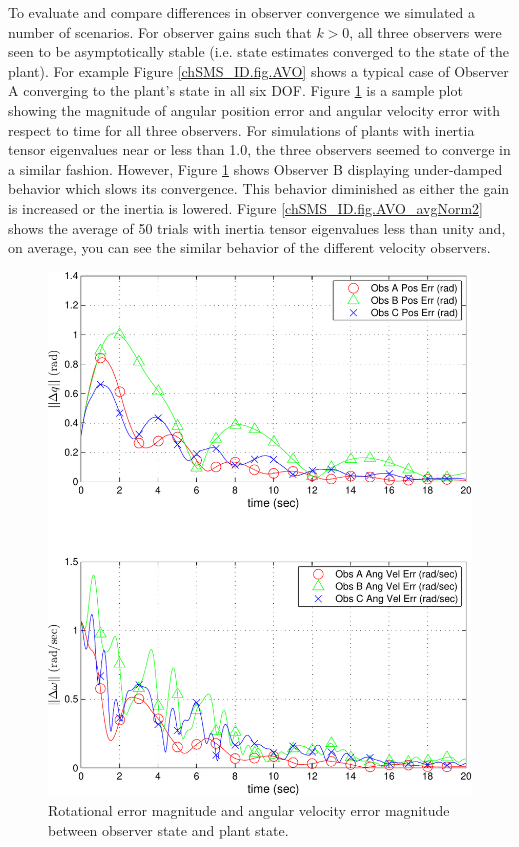 To evaluate and compare differences in observer convergence we
simulated a number of scenarios.  For observer gains such that $k>0$,
all three observers were seen to be asymptotically stable (i.e. state
estimates converged to the state of the plant).  For example Figure
\ref{chSMS_ID.fig.AVO} shows a typical case of Observer A converging
to the plant's state in all six \ac{DOF}. Figure
\ref{chSMS_ID.fig.AVO_allNorm} is a sample plot showing the magnitude
of angular position error and angular velocity error with respect to
time for all three observers.  For simulations of plants with
inertia tensor eigenvalues near or less than 1.0, the three
observers seemed to converge in a similar fashion. However, Figure
\ref{chSMS_ID.fig.AVO_allNorm} shows Observer B displaying
under-damped behavior which slows its convergence.  This behavior
diminished as either the gain is increased or the inertia is lowered.
Figure \ref{chSMS_ID.fig.AVO_avgNorm2} shows the average of 50 trials
with inertia tensor eigenvalues less than unity and, on average, you
can see the similar behavior of the different velocity
observers.

\begin{center}
\begin{figure}[htbp]  
  \begin{center}
    \includegraphics[width=150mm]{./chSMS_ID/images/obsNormErrPlot}%
  \end{center}
  \caption{Rotational error magnitude and angular velocity error
    magnitude between observer state and plant state.}
  \label{chSMS_ID.fig.AVO_allNorm}
\end{figure}
\end{center}

